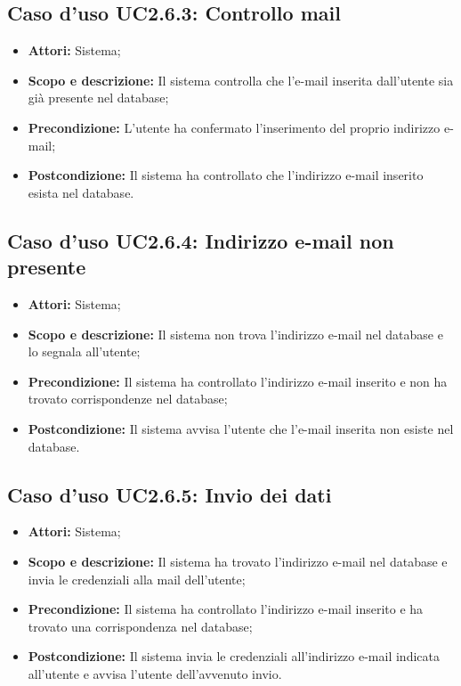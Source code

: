 \subsection{Caso d'uso UC2.6.3: Controllo mail}
\begin{itemize}
	\item \textbf{Attori:} Sistema;
	\item \textbf{Scopo e descrizione:} Il sistema controlla che l'e-mail inserita dall'utente sia già presente nel database;
	\item \textbf{Precondizione:} L'utente ha confermato l'inserimento del proprio indirizzo e-mail;
	\item \textbf{Postcondizione:} Il sistema ha controllato che l'indirizzo e-mail inserito esista nel database.
\end{itemize}

\subsection{Caso d'uso UC2.6.4: Indirizzo e-mail non presente}
\begin{itemize}
	\item \textbf{Attori:} Sistema;
	\item \textbf{Scopo e descrizione:} Il sistema non trova l'indirizzo e-mail nel database e lo segnala all'utente;
	\item \textbf{Precondizione:} Il sistema ha controllato l'indirizzo e-mail inserito e non ha trovato corrispondenze nel database;
	\item \textbf{Postcondizione:} Il sistema avvisa l'utente che l'e-mail inserita non esiste nel database.
\end{itemize}

\subsection{Caso d'uso UC2.6.5: Invio dei dati}
\begin{itemize}
	\item \textbf{Attori:} Sistema;
	\item \textbf{Scopo e descrizione:} Il sistema ha trovato l'indirizzo e-mail nel database e invia le credenziali alla mail dell'utente;
	\item \textbf{Precondizione:} Il sistema ha controllato l'indirizzo e-mail inserito e ha trovato una corrispondenza nel database;
	\item \textbf{Postcondizione:} Il sistema invia le credenziali all'indirizzo e-mail indicata all'utente e avvisa l'utente dell'avvenuto invio.
\end{itemize}